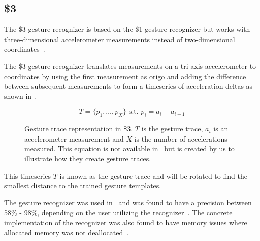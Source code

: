 


\subsection{\$3}

The \$3 gesture recognizer is based on the \$1 gesture recognizer but works with three-dimensional accelerometer measurements instead of two-dimensional coordinates~\cite{threedollar}.

The \$3 gesture recognizer translates measurements on a tri-axis accelerometer to coordinates by using the first measurement as origo and adding the difference between subsequent measurements to form a timeseries of acceleration deltas as shown in .

\begin{figure}[h]
\[ T = \{p_1,\ldots,p_X\} \text{ s.t. } p_i=a_i-a_{i-1} \]
\caption{Gesture trace representation in \$3. $T$ is the gesture trace, $a_i$ is an accelerometer measurement and $X$ is the number of accelerations measured.
This equation is not available in~\cite{threedollar} but is created by us to illustrate how they create gesture traces.}
\label{eq:acceleration-timeseries}
\end{figure}

This timeseries $T$ is known as the gesture trace and will be rotated to find the smallest distance to the trained gesture templates.

The gesture recognizer was used in~\cite{prespecialisation} and was found to have a precision between 58\% - 98\%, depending on the user utilizing the recognizer~\cite[p. 344]{threedollar}. The concrete implementation of the recognizer was also found to have memory issues where allocated memory was not deallocated~\cite[p. 54]{prespecialisation}.

